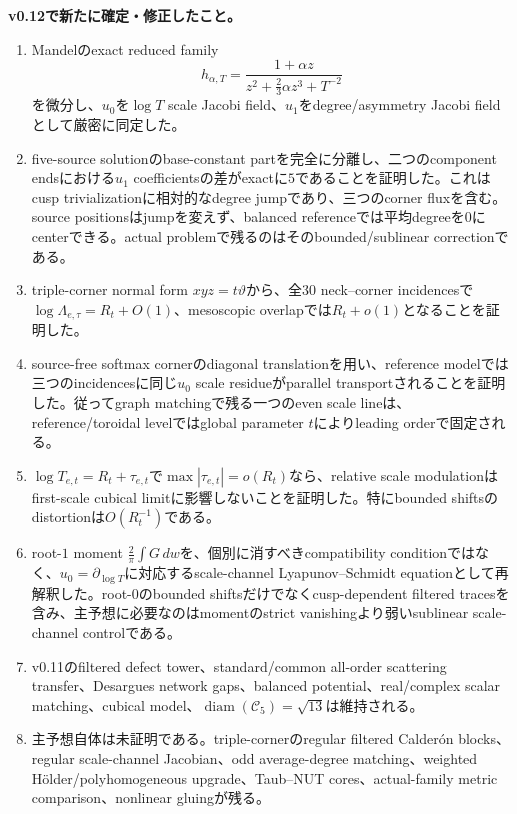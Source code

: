 \documentclass[11pt,a4paper]{ltjsarticle}
\theoremstyle{definition}
\theoremstyle{remark}
\newcommand{\diam}{\operatorname{diam}}
\begin{document}
\begin{statusbox}
\textbf{v0.12で新たに確定・修正したこと。}
\begin{enumerate}[leftmargin=2em,itemsep=1mm]
\item Mandelのexact reduced family
\[
 h_{\alpha,T}=\frac{1+\alpha z}{z^2+\frac23\alpha z^3+T^{-2}}
\]
を微分し、$u_0$を$\log T$ scale Jacobi field、$u_1$をdegree/asymmetry Jacobi fieldとして厳密に同定した。
\item five-source solutionのbase-constant partを完全に分離し、二つのcomponent endsにおける$u_1$ coefficientsの差がexactに$5$であることを証明した。これはcusp trivializationに相対的なdegree jumpであり、三つのcorner fluxを含む。source positionsはjumpを変えず、balanced referenceでは平均degreeを$0$にcenterできる。actual problemで残るのはそのbounded/sublinear correctionである。
\item triple-corner normal form $xyz=t\vartheta$から、全30 neck--corner incidencesで$\log\Lambda_{e,\tau}=R_t+O(1)$、mesoscopic overlapでは$R_t+o(1)$となることを証明した。
\item source-free softmax cornerのdiagonal translationを用い、reference modelでは三つのincidencesに同じ$u_0$ scale residueがparallel transportされることを証明した。従ってgraph matchingで残る一つのeven scale lineは、reference/toroidal levelではglobal parameter $t$によりleading orderで固定される。
\item $\log T_{e,t}=R_t+\tau_{e,t}$で$\max|\tau_{e,t}|=o(R_t)$なら、relative scale modulationはfirst-scale cubical limitに影響しないことを証明した。特にbounded shiftsのdistortionは$O(R_t^{-1})$である。
\item root-$1$ moment $\frac2\pi\int G\,dw$を、個別に消すべきcompatibility conditionではなく、$u_0=\partial_{\log T}$に対応するscale-channel Lyapunov--Schmidt equationとして再解釈した。root-$0$のbounded shiftsだけでなくcusp-dependent filtered tracesを含み、主予想に必要なのはmomentのstrict vanishingより弱いsublinear scale-channel controlである。
\item v0.11のfiltered defect tower、standard/common all-order scattering transfer、Desargues network gaps、balanced potential、real/complex scalar matching、cubical model、$\diam(\mathcal C_5)=\sqrt{13}$は維持される。
\item 主予想自体は未証明である。triple-cornerのregular filtered Calder\'on blocks、regular scale-channel Jacobian、odd average-degree matching、weighted Hölder/polyhomogeneous upgrade、Taub--NUT cores、actual-family metric comparison、nonlinear gluingが残る。
\end{enumerate}
\end{statusbox}
\end{document}
